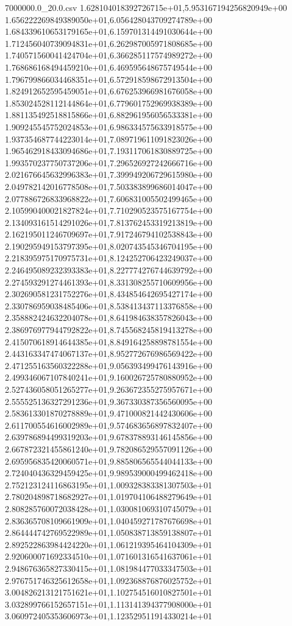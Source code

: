 \begin{filecontents*}{7000000.0_20.0.csv}
1.628104018392726715e+01,5.953167194256820949e+00
1.656222269849389050e+01,6.056428043709274789e+00
1.684339610653179165e+01,6.159701314491030644e+00
1.712456040739094831e+01,6.262987005971808685e+00
1.740571560041424704e+01,6.366285117574989272e+00
1.768686168494459210e+01,6.469595648675749544e+00
1.796799866034468351e+01,6.572918598672913504e+00
1.824912652595459051e+01,6.676253966981676058e+00
1.853024528112144864e+01,6.779601752969938389e+00
1.881135492518815866e+01,6.882961956056533381e+00
1.909245545752024853e+01,6.986334575633918575e+00
1.937354687744223014e+01,7.089719611091823026e+00
1.965462918433094686e+01,7.193117061830889725e+00
1.993570237750737206e+01,7.296526927242666716e+00
2.021676645632996383e+01,7.399949206729615980e+00
2.049782142016778508e+01,7.503383899686014047e+00
2.077886726833968822e+01,7.606831005502499465e+00
2.105990400021827824e+01,7.710290523575167754e+00
2.134093161514291026e+01,7.813762453319213819e+00
2.162195011246709697e+01,7.917246794102538843e+00
2.190295949153797395e+01,8.020743545346704195e+00
2.218395975170975731e+01,8.124252706423249037e+00
2.246495089232393383e+01,8.227774276744639792e+00
2.274593291274461393e+01,8.331308255710609956e+00
2.302690581231752276e+01,8.434854642695427174e+00
2.330786959038485406e+01,8.538413437113376858e+00
2.358882424632204078e+01,8.641984638357826043e+00
2.386976977944792822e+01,8.745568245819413278e+00
2.415070618914644385e+01,8.849164258898781554e+00
2.443163347474067137e+01,8.952772676986569422e+00
2.471255163560322288e+01,9.056393499476143916e+00
2.499346067107840241e+01,9.160026725780880952e+00
2.527436058051265277e+01,9.263672355275957671e+00
2.555525136327291236e+01,9.367330387356560095e+00
2.583613301870278889e+01,9.471000821442430606e+00
2.611700554616002989e+01,9.574683656897832407e+00
2.639786894499319203e+01,9.678378893146145856e+00
2.667872321455861240e+01,9.782086529557091126e+00
2.695956835420060571e+01,9.885806565544044133e+00
2.724040436329459425e+01,9.989539000499462418e+00
2.752123124116863195e+01,1.009328383381307503e+01
2.780204898718682927e+01,1.019704106488279649e+01
2.808285760072038428e+01,1.030081069310745079e+01
2.836365708109661909e+01,1.040459271787676698e+01
2.864444742769522989e+01,1.050838713859138807e+01
2.892522863984424220e+01,1.061219395464104309e+01
2.920600071692334510e+01,1.071601316541637061e+01
2.948676365827330415e+01,1.081984477033347503e+01
2.976751746325612658e+01,1.092368876876025752e+01
3.004826213121751621e+01,1.102754516010827501e+01
3.032899766152657151e+01,1.113141394377908000e+01
3.060972405353606973e+01,1.123529511914330214e+01

\end{filecontents*}
